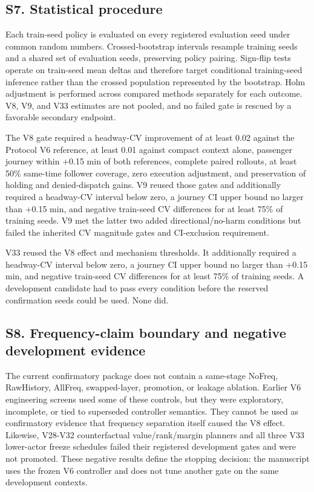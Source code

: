 \documentclass[10pt]{article}
\begin{document}
\subsection{S7. Statistical procedure}\label{s7.-statistical-procedure}

Each train-seed policy is evaluated on every registered evaluation seed
under common random numbers. Crossed-bootstrap intervals resample
training seeds and a shared set of evaluation seeds, preserving policy
pairing. Sign-flip tests operate on train-seed mean deltas and therefore
target conditional training-seed inference rather than the crossed
population represented by the bootstrap. Holm adjustment is performed
across compared methods separately for each outcome. V8, V9, and V33
estimates are not pooled, and no failed gate is rescued by a favorable
secondary endpoint.

The V8 gate required a headway-CV improvement of at least 0.02 against
the Protocol V6 reference, at least 0.01 against compact context alone,
passenger journey within +0.15 min of both references, complete paired
rollouts, at least 50\% same-time follower coverage, zero execution
adjustment, and preservation of holding and denied-dispatch gains. V9
reused those gates and additionally required a headway-CV interval below
zero, a journey CI upper bound no larger than +0.15 min, and negative
train-seed CV differences for at least 75\% of training seeds. V9 met
the latter two added directional/no-harm conditions but failed the
inherited CV magnitude gates and CI-exclusion requirement.

V33 reused the V8 effect and mechanism thresholds. It additionally
required a headway-CV interval below zero, a journey CI upper bound no
larger than +0.15 min, and negative train-seed CV differences for at
least 75\% of training seeds. A development candidate had to pass every
condition before the reserved confirmation seeds could be used. None
did.

\subsection{S8. Frequency-claim boundary and negative development
evidence}\label{s8.-frequency-claim-boundary-and-negative-development-evidence}

The current confirmatory package does not contain a same-stage NoFreq,
RawHistory, AllFreq, swapped-layer, promotion, or leakage ablation.
Earlier V6 engineering screens used some of these controls, but they
were exploratory, incomplete, or tied to superseded controller
semantics. They cannot be used as confirmatory evidence that frequency
separation itself caused the V8 effect. Likewise, V28-V32 counterfactual
value/rank/margin planners and all three V33 lower-actor freeze
schedules failed their registered development gates and were not
promoted. These negative results define the stopping decision: the
manuscript uses the frozen V6 controller and does not tune another gate
on the same development contexts.
\end{document}

